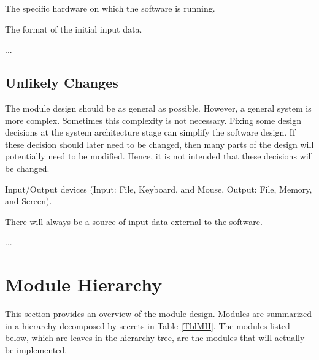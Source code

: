 \documentclass[12pt, titlepage]{article}
\newcounter{acnum}
\newcommand{\actheacnum}{AC\theacnum}
\newcounter{ucnum}
\newcommand{\uctheucnum}{UC\theucnum}
\begin{document}
\begin{description}
\item[ \actheacnum \label{acHardware}:] The specific
  hardware on which the software is running.
\item[ \actheacnum \label{acInput}:] The format of the
  initial input data.
\item ...
\end{description}

\subsection{Unlikely Changes} \label{SecUchange}

The module design should be as general as possible. However, a general system is
more complex. Sometimes this complexity is not necessary. Fixing some design
decisions at the system architecture stage can simplify the software design. If
these decision should later need to be changed, then many parts of the design
will potentially need to be modified. Hence, it is not intended that these
decisions will be changed.

\begin{description}
\item[ \uctheucnum \label{ucIO}:] Input/Output devices
  (Input: File, Keyboard, and Mouse, Output: File, Memory, and Screen).
\item[ \uctheucnum \label{ucInput}:] There will always be
  a source of input data external to the software.
\item ...
\end{description}

\section{Module Hierarchy} \label{SecMH}

This section provides an overview of the module design. Modules are summarized
in a hierarchy decomposed by secrets in Table \ref{TblMH}. The modules listed
below, which are leaves in the hierarchy tree, are the modules that will
actually be implemented.
\end{document}
